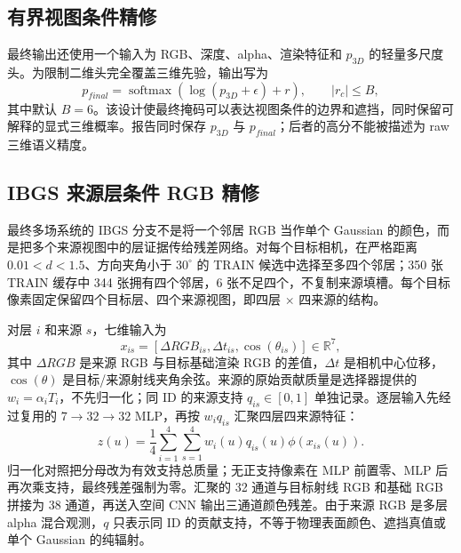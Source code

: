 \documentclass[UTF8,a4paper,11pt]{ctexart}
\newcommand{\R}{\mathbb{R}}
\begin{document}
\subsection{有界视图条件精修}
最终输出还使用一个输入为 RGB、深度、alpha、渲染特征和 $p_{3D}$ 的轻量多尺度头。为限制二维头完全覆盖三维先验，输出写为
\begin{equation}
  p_{final}=\operatorname{softmax}(\log(p_{3D}+\epsilon)+r),
  \qquad |r_c|\le B,
\end{equation}
其中默认 $B=6$。该设计使最终掩码可以表达视图条件的边界和遮挡，同时保留可解释的显式三维概率。报告同时保存 $p_{3D}$ 与 $p_{final}$；后者的高分不能被描述为 raw 三维语义精度。

\subsection{IBGS 来源层条件 RGB 精修}
最终多场系统的 IBGS 分支不是将一个邻居 RGB 当作单个 Gaussian 的颜色，而是把多个来源视图中的层证据传给残差网络。对每个目标相机，在严格距离 $0.01<d<1.5$、方向夹角小于 $30^\circ$ 的 TRAIN 候选中选择至多四个邻居；350 张 TRAIN 缓存中 344 张拥有四个邻居，6 张不足四个，不复制来源填槽。每个目标像素固定保留四个目标层、四个来源视图，即四层 $\times$ 四来源的结构。

对层 $i$ 和来源 $s$，七维输入为
\begin{equation}
 x_{is}=[\Delta RGB_{is},\Delta t_{is},\cos(\theta_{is})]\in\R^7,
\end{equation}
其中 $\Delta RGB$ 是来源 RGB 与目标基础渲染 RGB 的差值，$\Delta t$ 是相机中心位移，$\cos(\theta)$ 是目标/来源射线夹角余弦。来源的原始贡献质量是选择器提供的 $w_i=\alpha_i T_i$，不先归一化；同 ID 的来源支持 $q_{is}\in[0,1]$ 单独记录。逐层输入先经过复用的 $7\to32\to32$ MLP，再按 $w_iq_{is}$ 汇聚四层四来源特征：
\begin{equation}
 z(u)=\frac{1}{4}\sum_{i=1}^{4}\sum_{s=1}^{4}w_i(u)q_{is}(u)\phi(x_{is}(u)).
\end{equation}
归一化对照把分母改为有效支持总质量；无正支持像素在 MLP 前置零、MLP 后再次乘支持，最终残差强制为零。汇聚的 32 通道与目标射线 RGB 和基础 RGB 拼接为 38 通道，再送入空间 CNN 输出三通道颜色残差。由于来源 RGB 是多层 alpha 混合观测，$q$ 只表示同 ID 的贡献支持，不等于物理表面颜色、遮挡真值或单个 Gaussian 的纯辐射。
\end{document}
